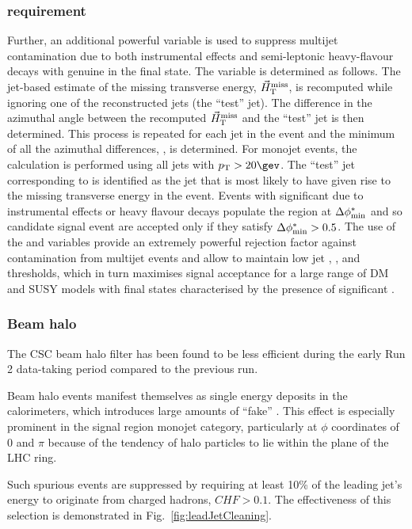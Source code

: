 \subsubsection{\bdphi requirement} 
\label{sec:bdphi-selection}

Further, an additional powerful variable \bdphi is used to suppress
multijet contamination due to both instrumental effects and
semi-leptonic heavy-flavour decays with genuine \met in the final
state. The variable is determined as follows. The jet-based estimate
of the missing transverse energy, ${\mbox{$\vec{H}_{\rm T}^{\rm miss}$}}$, is recomputed while
ignoring one of the reconstructed jets (the ``test'' jet). The
difference in the azimuthal angle between the recomputed $\mbox{$\vec{H}_{\rm T}^{\rm miss}$}$
and the ``test'' jet is then determined. This process is repeated for
each jet in the event and the minimum of all the azimuthal
differences, \bdphi, is determined. For monojet events, the calculation is 
performed using all jets with $\Pt > 20\gev$. 
The ``test'' jet corresponding to \bdphi is 
identified as the jet that is most likely to have given rise to the
missing transverse energy in the event. Events with significant \mht
due to instrumental effects or heavy flavour decays populate the
region at $\mbox{$\Delta\phi^{*}_{\rm min}$}$ and so candidate signal event are accepted
only if they satisfy $\mbox{$\Delta\phi^{*}_{\rm min}$} > 0.5$. The use of the \bdphi and \alphat
variables provide an extremely powerful rejection factor against
contamination from multijet events and allow to maintain low jet \PT,
\HT, and \mht thresholds, which in turn maximises signal acceptance
for a large range of DM and SUSY models with final states
characterised by the presence of significant \met.

  
\subsubsection{Beam halo}
\label{beam-halo-selection}

The CSC beam halo filter has been found to be less efficient during the early
Run 2 data-taking period compared to the previous run.

Beam halo events manifest themselves as single energy deposits in the
calorimeters, which introduces large amounts of ``fake'' \met. This effect is
especially prominent in the signal region monojet category, particularly at
$\phi$ coordinates of 0 and $\pi$ because of the tendency of halo particles to
lie within the plane of the LHC ring. 

Such spurious events are suppressed by requiring at least 10\% of the leading
jet's energy to originate from charged hadrons, $CHF>0.1$. The effectiveness of this selection
is demonstrated in Fig.~\ref{fig:leadJetCleaning}.

